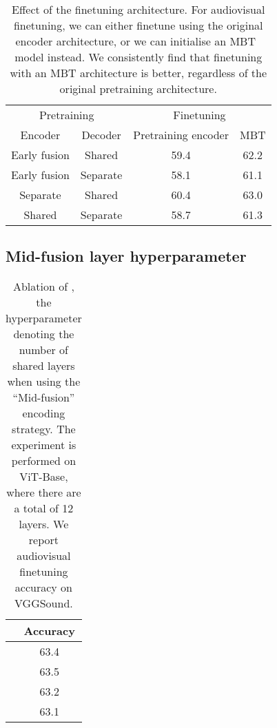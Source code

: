 \documentclass[10pt,twocolumn,letterpaper]{article}
\begin{document}
\begin{table}[t] 
	\caption{Effect of the finetuning architecture.
		For audiovisual finetuning, we can either finetune using the original encoder architecture, or we can initialise an MBT~\cite{nagrani2021attention} model instead.
		We consistently find that finetuning with an MBT architecture is better, regardless of the original pretraining architecture.
	}
	\vspace{-0.6\baselineskip}
	\centering
		\begin{tabular}{cccc}
			\toprule
			\multicolumn{2}{c}{Pretraining} & \multicolumn{2}{c}{Finetuning} \\
			\cmidrule(r){1-2} \cmidrule(l){3-4}
			Encoder & Decoder &  Pretraining encoder &  MBT\\
			\midrule
			
			Early fusion           & Shared     &    59.4  & 62.2         \\
			Early fusion           & Separate   &    58.1  & 61.1      \\
			Separate          & Shared     &       60.4    & 63.0  \\
			Shared            & Separate   &       58.7    & 61.3 \\
			\bottomrule
		\end{tabular}
		\label{tab:ablation_finetuning_arch}
\end{table} 


\subsection{Mid-fusion layer hyperparameter}

\begin{table}[t]  
	\caption{Ablation of , the hyperparameter denoting the number of shared layers when using the ``Mid-fusion'' encoding strategy.
		The experiment is performed on ViT-Base, where there are a total of 12 layers.
		We report audiovisual finetuning accuracy on VGGSound.}
	\centering 
		\begin{tabular}{cc}
			\toprule
			 & Accuracy\\ \midrule 
			   &  63.4\\
			   &  63.5 \\
			   &  63.2 \\  
			  &  63.1 \\   
			
			\bottomrule
		\end{tabular}
	\label{tab:ablation_midfusion}
\end{table}
\end{document}

